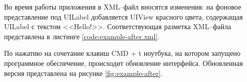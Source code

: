

Во время работы приложения в XML--файл вносятся изменения: на фоновое представление под UILabel добавляется UIView красного цвета, содержащая UILabel с текстом <<Hello!>>. Соответствующая разметка XML--файла представлена в листинге \ref{code:example-after.xml}. 

По нажатию на сочетание клавиш CMD + t ноутбука, на котором запущено программное обеспечение, происходит обновление интерфейса. 
Обновленная версия представлена на рисунке \ref{fig:example-after}.

